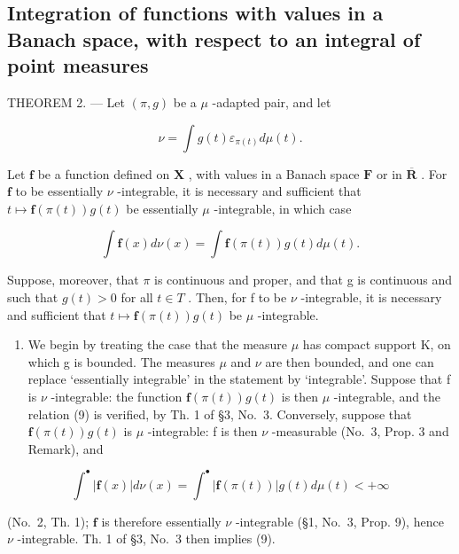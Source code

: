 \subsection{Integration of functions with values in a Banach space, with respect to an integral of point measures}

THEOREM 2. --- Let \((\pi, g)\) be a \(\mu\) -adapted pair, and let

\[
\nu = \int g (t) \varepsilon_ {\pi (t)} d \mu (t).
\]

Let \(\mathbf{f}\) be a function defined on \(\mathbf{X}\) , with values in a Banach space \(\mathbf{F}\) or in \(\overline{\mathbf{R}}\) . For \(\mathbf{f}\) to be essentially \(\nu\) -integrable, it is necessary and sufficient that \(t \mapsto \mathbf{f}(\pi(t))g(t)\) be essentially \(\mu\) -integrable, in which case

\[
\int \mathbf {f} (x) d \nu (x) = \int \mathbf {f} (\pi (t)) g (t) d \mu (t).\tag{9}
\]

Suppose, moreover, that \(\pi\) is continuous and proper, and that g is continuous and such that \(g(t) > 0\) for all \(t \in T\) . Then, for f to be \(\nu\) -integrable, it is necessary and sufficient that \(t \mapsto \mathbf{f}(\pi(t))g(t)\) be \(\mu\) -integrable.

\begin{enumerate}
\def\labelenumi{\Alph{enumi})}
\tightlist
\item
  We begin by treating the case that the measure \(\mu\) has compact support K, on which g is bounded. The measures \(\mu\) and \(\nu\) are then bounded, and one can replace `essentially integrable' in the statement by `integrable'. Suppose that f is \(\nu\) -integrable: the function \(\mathbf{f}(\pi(t))g(t)\) is then \(\mu\) -integrable, and the relation (9) is verified, by Th. 1 of §3, No.~3. Conversely, suppose that \(\mathbf{f}(\pi(t))g(t)\) is \(\mu\) -integrable: f is then \(\nu\) -measurable (No.~3, Prop. 3 and Remark), and
\end{enumerate}

\[
\int^ {\bullet} | \mathbf {f} (x) | d \nu (x) = \int^ {\bullet} | \mathbf {f} (\pi (t)) | g (t) d \mu (t) <   + \infty
\]

(No.~2, Th. 1); \(\mathbf{f}\) is therefore essentially \(\nu\) -integrable (§1, No.~3, Prop. 9), hence \(\nu\) -integrable. Th. 1 of §3, No.~3 then implies (9).

